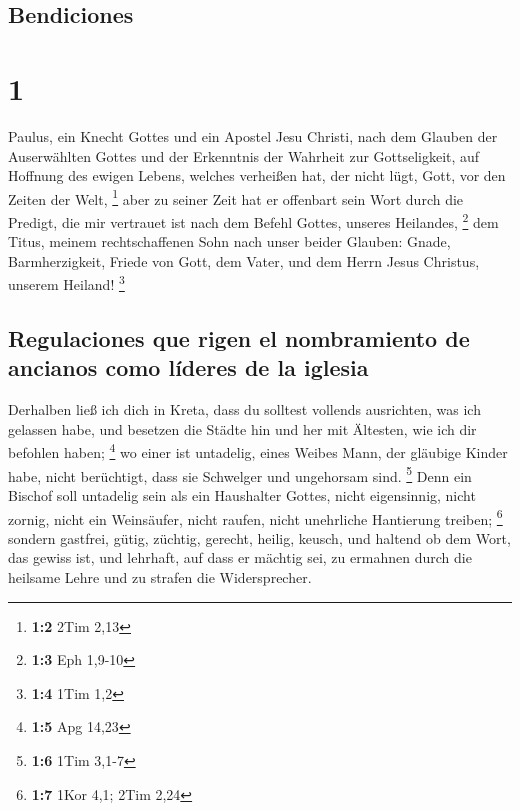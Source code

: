 \hypertarget{bendiciones}{%
\subsection{Bendiciones}\label{bendiciones}}

\hypertarget{section}{%
\section{1}\label{section}}

 Paulus, ein Knecht Gottes und ein Apostel Jesu Christi,
nach dem Glauben der Auserwählten Gottes und der Erkenntnis der Wahrheit
zur Gottseligkeit,  auf Hoffnung des ewigen Lebens,
welches verheißen hat, der nicht lügt, Gott, vor den Zeiten der Welt,
\footnote{\textbf{1:2} 2Tim 2,13}  aber zu seiner Zeit hat
er offenbart sein Wort durch die Predigt, die mir vertrauet ist nach dem
Befehl Gottes, unseres Heilandes, \footnote{\textbf{1:3} Eph 1,9-10}
 dem Titus, meinem rechtschaffenen Sohn nach unser beider
Glauben: Gnade, Barmherzigkeit, Friede von Gott, dem Vater, und dem
Herrn Jesus Christus, unserem Heiland! \footnote{\textbf{1:4} 1Tim 1,2}

\hypertarget{regulaciones-que-rigen-el-nombramiento-de-ancianos-como-luxedderes-de-la-iglesia}{%
\subsection{Regulaciones que rigen el nombramiento de ancianos como
líderes de la
iglesia}\label{regulaciones-que-rigen-el-nombramiento-de-ancianos-como-luxedderes-de-la-iglesia}}

 Derhalben ließ ich dich in Kreta, dass du solltest
vollends ausrichten, was ich gelassen habe, und besetzen die Städte hin
und her mit Ältesten, wie ich dir befohlen haben; \footnote{\textbf{1:5}
  Apg 14,23}  wo einer ist untadelig, eines Weibes Mann,
der gläubige Kinder habe, nicht berüchtigt, dass sie Schwelger und
ungehorsam sind. \footnote{\textbf{1:6} 1Tim 3,1-7}  Denn
ein Bischof soll untadelig sein als ein Haushalter Gottes, nicht
eigensinnig, nicht zornig, nicht ein Weinsäufer, nicht raufen, nicht
unehrliche Hantierung treiben; \footnote{\textbf{1:7} 1Kor 4,1; 2Tim
  2,24}  sondern gastfrei, gütig, züchtig, gerecht,
heilig, keusch,  und haltend ob dem Wort, das gewiss ist,
und lehrhaft, auf dass er mächtig sei, zu ermahnen durch die heilsame
Lehre und zu strafen die Widersprecher.


